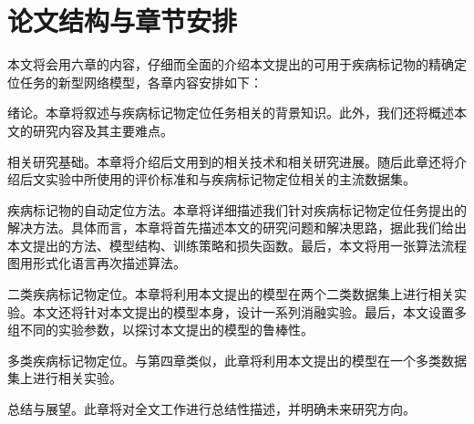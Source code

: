 \section{论文结构与章节安排}\label{sec:arrangement}
本文将会用六章的内容，仔细而全面的介绍本文提出的可用于疾病标记物的精确定位任务的新型网络模型，各章内容安排如下：
\begin{description}[style=multiline,leftmargin=1.7cm]
	\item[第一章：] 绪论。本章将叙述与疾病标记物定位任务相关的背景知识。此外，我们还将概述本文的研究内容及其主要难点。
	\item[第二章：] 相关研究基础。本章将介绍后文用到的相关技术和相关研究进展。随后此章还将介绍后文实验中所使用的评价标准和与疾病标记物定位相关的主流数据集。
	\item[第三章：] 疾病标记物的自动定位方法。本章将详细描述我们针对疾病标记物定位任务提出的解决方法。具体而言，本章将首先描述本文的研究问题和解决思路，据此我们给出本文提出的方法、模型结构、训练策略和损失函数。最后，本文将用一张算法流程图用形式化语言再次描述算法。
	\item[第四章：] 二类疾病标记物定位。本章将利用本文提出的模型在两个二类数据集上进行相关实验。本文还将针对本文提出的模型本身，设计一系列消融实验。最后，本文设置多组不同的实验参数，以探讨本文提出的模型的鲁棒性。
	\item[第五章：] 多类疾病标记物定位。与第四章类似，此章将利用本文提出的模型在一个多类数据集上进行相关实验。
	\item[第六章：] 总结与展望。此章将对全文工作进行总结性描述，并明确未来研究方向。
\end{description}